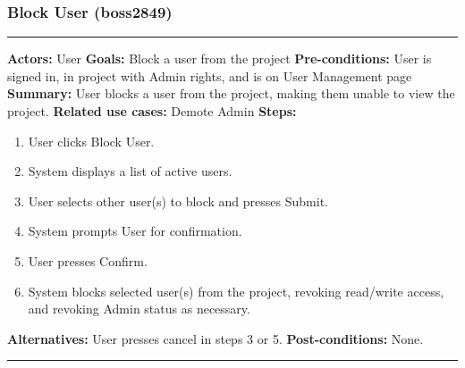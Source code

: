 \documentclass[11pt]{report}
\begin{document}
\subsubsection{Block User (boss2849)}
\vspace{2pt}
\hrule
\vspace{8pt}
 \textbf{Actors:} User \newline
\textbf{Goals:} Block a user from the project \newline
 \textbf{Pre-conditions:} User is signed in, in project with Admin rights, and is on User Management page \newline
 \textbf{Summary:} User blocks a user from the project, making them unable to view the project. \newline
\textbf{Related use cases:} Demote Admin \newline
\textbf{Steps:} \begin{enumerate}
  \item User clicks Block User.
  \item System displays a list of active users.
  \item User selects other user(s) to block and presses Submit.
  \item System prompts User for confirmation.
  \item User presses Confirm.
  \item System blocks selected user(s) from the project, revoking read/write access, and revoking Admin status as necessary.
 \end{enumerate}
 \textbf{Alternatives:} User presses cancel in steps 3 or 5.
 \textbf{Post-conditions:} None. \newline
\vspace{8pt}
\hrule
\end{document}
